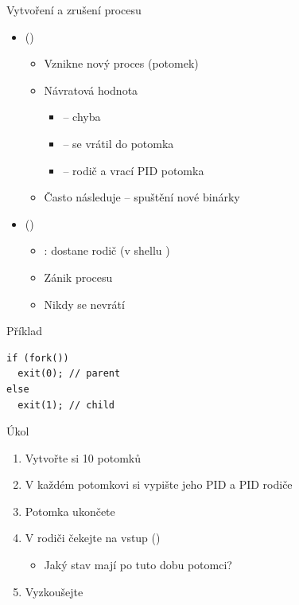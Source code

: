 \fi

\begin{frame}[fragile]{Vytvoření a zrušení procesu}

  \begin{itemize}
    \item {} ()
    \begin{itemize}
      \item Vznikne nový proces (potomek)
      \item Návratová hodnota
      \begin{itemize}
        \item {} -- chyba
        \item {} --  se vrátil do potomka
        \item {} -- rodič a  vrací PID potomka
      \end{itemize}

      \pause

      \item Často následuje  -- spuštění nové binárky
    \end{itemize}

    \pause

    \item {} ()
    \begin{itemize}
      \item {}: dostane rodič (v shellu )
      \item Zánik procesu
      \item Nikdy se nevrátí
    \end{itemize}
  \end{itemize}

  \pause

  \begin{block}{Příklad}
    \begin{lstlisting}[aboveskip=2pt,belowskip=2pt]
if (fork())
  exit(0); // parent
else
  exit(1); // child
    \end{lstlisting}
  \end{block}

\end{frame}

\begin{frame}{Úkol}

  \begin{enumerate}
    \item Vytvořte si 10 potomků
    \item V každém potomkovi si vypište jeho PID a PID rodiče
    \item Potomka ukončete

    \item V rodiči čekejte na vstup ()
    \begin{itemize}
      \item Jaký stav mají po tuto dobu potomci?
    \end{itemize}
    \item Vyzkoušejte
  \end{enumerate}

\end{frame}

